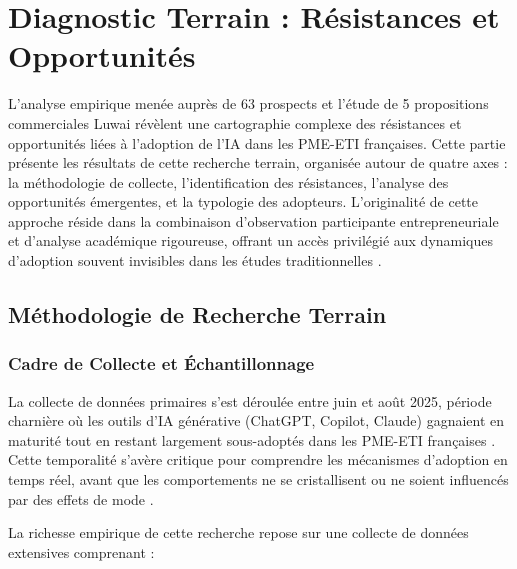 \chapter{Diagnostic Terrain : Résistances et Opportunités}
\label{chap:field_diagnosis}

L'analyse empirique menée auprès de 63 prospects et l'étude de 5 propositions commerciales Luwai révèlent une cartographie complexe des résistances et opportunités liées à l'adoption de l'IA dans les PME-ETI françaises. Cette partie présente les résultats de cette recherche terrain, organisée autour de quatre axes : la méthodologie de collecte, l'identification des résistances, l'analyse des opportunités émergentes, et la typologie des adopteurs. L'originalité de cette approche réside dans la combinaison d'observation participante entrepreneuriale et d'analyse académique rigoureuse, offrant un accès privilégié aux dynamiques d'adoption souvent invisibles dans les études traditionnelles \cite{yin2018case}.

\section{Méthodologie de Recherche Terrain}

\subsection{Cadre de Collecte et Échantillonnage}

La collecte de données primaires s'est déroulée entre juin et août 2025, période charnière où les outils d'IA générative (ChatGPT, Copilot, Claude) gagnaient en maturité tout en restant largement sous-adoptés dans les PME-ETI françaises \cite{bpifrance2025ia}. Cette temporalité s'avère critique pour comprendre les mécanismes d'adoption en temps réel, avant que les comportements ne se cristallisent ou ne soient influencés par des effets de mode \cite{rogers2003diffusion}.

La richesse empirique de cette recherche repose sur une collecte de données extensives comprenant :

